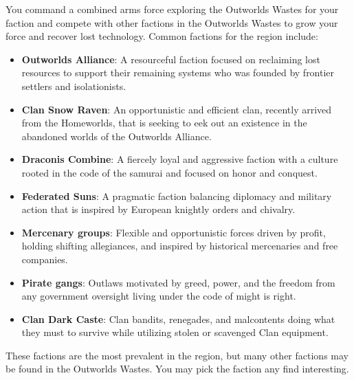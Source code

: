 You command a combined arms force exploring the Outworlds Wastes for your faction and compete with other factions in the Outworlds Wastes to grow your force and recover lost technology.
Common factions for the region include:

\begin{itemize}

\item {\bfseries Outworlds Alliance}: A resourceful faction focused on reclaiming lost resources to support their remaining systems who was founded by frontier settlers and isolationists.

\item {\bfseries Clan Snow Raven}: An opportunistic and efficient clan, recently arrived from the Homeworlds, that is seeking to eek out an existence in the abandoned worlds of the Outworlds Alliance. 

\item {\bfseries Draconis Combine}: A fiercely loyal and aggressive faction with a culture rooted in the code of the samurai and focused on honor and conquest.

\item {\bfseries Federated Suns}: A pragmatic faction balancing diplomacy and military action that is inspired by European knightly orders and chivalry.

\item {\bfseries Mercenary groups}: Flexible and opportunistic forces driven by profit, holding shifting allegiances, and inspired by historical mercenaries and free companies.

\item {\bfseries Pirate gangs}: Outlaws motivated by greed, power, and the freedom from any government oversight living under the code of might is right. 

\item {\bfseries Clan Dark Caste}: Clan bandits, renegades, and malcontents doing what they must to survive while utilizing stolen or scavenged Clan equipment.

\end{itemize}

These factions are the most prevalent in the region, but many other factions may be found in the Outworlds Wastes.
You may pick the faction any find interesting.
